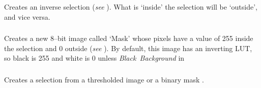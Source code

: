 Creates an inverse selection (\emph{see} ).
What is `inside' the selection will be `outside', and vice versa.


\subsubsection{\protect{}\label{sub:Create-Mask}}

Creates a new 8--bit image called `Mask' whose pixels
have a value of 255 inside the selection and 0 outside (\emph{see}
). By default, this image has an inverting
LUT, so black is 255 and white is 0 unless \emph{Black~Background}
in 




\subsubsection{\protect{}\label{sub:Create-Selection}}

Creates a selection from a thresholded image or a binary mask \cite{C-CreateSelection}. 


\subsubsection[{\protect\userinterface{Properties\ldots{}\ {[}y{]}}}]{\protect{}\label{sub:Properties...}\improvement{}}


